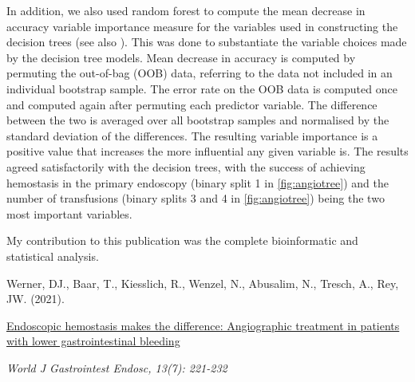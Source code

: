 In addition, we also used random forest to compute the mean decrease in
accuracy variable importance measure for the variables used in constructing
the decision trees \citep{Han2016} (see also ). This
was done to substantiate the variable choices made by the decision tree
models. Mean decrease in accuracy is computed by permuting the out-of-bag (OOB)
data, referring to the data not included in an individual bootstrap sample.
The error rate on the OOB data is computed once and computed again after
permuting each predictor variable.  The difference between the two is averaged
over all bootstrap samples and normalised by the standard deviation of the
differences. The resulting variable importance is a positive value that
increases the more influential any given variable is. The results agreed
satisfactorily with the decision trees, with the success of achieving
hemostasis in the primary endoscopy (binary split 1 in \cref{fig:angiotree})
and the number of transfusions (binary splits 3 and 4 in \cref{fig:angiotree})
being the two most important variables.

\vfill
\noindent My contribution to this publication was the complete bioinformatic
and statistical analysis.\nopagebreak
\medskip
\begin{tcolorbox}[
  boxrule=0pt, leftrule=1pt, colframe=s-blue, colback=white, sharp corners=all]%
  \raggedright
  Werner, DJ., Baar, T., Kiesslich, R., Wenzel, N., Abusalim, N., Tresch, A.,
  Rey, JW. (2021).
  
  \smallskip
  \href{https://www.wjgnet.com/1948-5190/full/v13/i7/221.htm}
    {Endoscopic hemostasis makes the difference: Angiographic treatment in
    patients with lower gastrointestinal bleeding}

  \smallskip
  \textit{World J Gastrointest Endosc, 13(7): 221-232}
\end{tcolorbox}


% 
